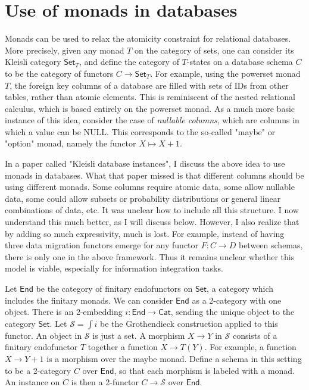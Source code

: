 \documentclass[11pt,oneside,article]{memoir}
\def\Set{\mathsf{Set}}
\def\Cat{\mathsf{Cat}}
\def\End{\mathsf{End}}
\def\S{\mathcal{S}}
\begin{document}
\section{Use of monads in databases}

Monads can be used to relax the atomicity constraint for relational databases. More precisely, given any monad $T$ on the category of sets, one can consider its Kleisli category $\Set_T$, and define the category of $T$-states on a database schema $C$ to be the category of functors $C\to\Set_T$. For example, using the powerset monad $T$, the foreign key columns of a database are filled with sets of IDs from other tables, rather than atomic elements. This is reminiscent of the nested relational calculus, which is based entirely on the powerset monad. As a much more basic instance of this idea, consider the case of \emph{nullable columns}, which are columns in which a value can be NULL. This corresponds to the so-called "maybe" or "option" monad, namely the functor $X\mapsto X+1$.

In a paper called "Kleisli database instances", I discuss the above idea to use monads in databases. What that paper missed is that different columns should be using different monads. Some columns require atomic data, some allow nullable data, some could allow subsets or probability distributions or general linear combinations of data, etc. It was unclear how to include all this structure. I now understand this much better, as I will discuss below. However, I also realize that by adding so much expressivity, much is lost. For example, instead of having three data migration functors emerge for any functor $F\colon C\to D$ between schemas, there is only one in the above framework. Thus it remains unclear whether this model is viable, especially for information integration tasks.

Let $\End$ be the category of finitary endofunctors on $\Set$, a category which includes the finitary monads. We can consider $\End$ as a 2-category with one object. There is an 2-embedding $i\colon \End\to\Cat$, sending the unique object to the category $\Set$. Let $\S=\int i$ be the Grothendieck construction applied to this functor. An object in $\S$ is just a set. A morphism $X\to Y$ in $\S$ consists of a finitary endofunctor $T$ together a function $X\to T(Y)$. For example, a function $X\to Y+1$ is a morphism over the maybe monad. Define a schema in this setting to be a 2-category $C$ over $\End$, so that each morphism is labeled with a monad. An instance on $C$ is then a 2-functor $C\to\S$ over $\End$. 
\end{document}
